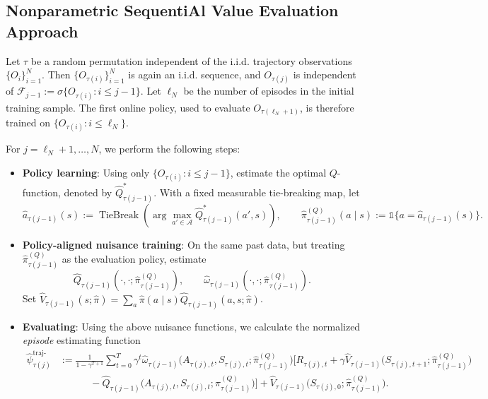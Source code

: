 \documentclass[12pt]{article}
\theoremstyle{remark}\newtheorem{remark}[theorem]{Remark}\theoremstyle{plain}
\newcommand{\EstestFunTraj}{\widehat{\psi}^{\text{traj-step}}}
\begin{document}
\subsection{Nonparametric SequentiAl Value Evaluation Approach}\label{sec:new_save}


Let $\tau$ be a random permutation independent of the i.i.d.
trajectory observations $\{O_i\}_{i=1}^N$.  Then
$\{O_{\tau(i)}\}_{i=1}^N$ is again an i.i.d. sequence, and
$O_{\tau(j)}$ is independent of
$\mathcal F_{j-1}:=\sigma\{O_{\tau(i)}:i\leq j-1\}$.
Let $\ell_N$ be the number of episodes in the initial training sample.
The first online policy, used to evaluate $O_{\tau(\ell_N+1)}$, is
therefore trained on
$\{O_{\tau(i)}:i\leq\ell_N\}$.

For $j = \ell_N + 1, \ldots, N$, we perform the following steps:
\begin{itemize}
    
    \item \textbf{Policy learning}: Using only
    $\{O_{\tau(i)}:i\leq j-1\}$, estimate the optimal $Q$-function,
    denoted by $\widehat Q_{\tau(j-1)}^*$.  With a fixed measurable
    tie-breaking map, let
    \[
        \widehat a_{\tau(j-1)}(s)
        :=\operatorname{TieBreak}\!\left(
        \arg\max_{a'\in\mathcal A}
        \widehat Q_{\tau(j-1)}^*(a',s)\right),
        \qquad
        \widehat{\pi}_{\tau(j - 1)}^{(Q)}(a \mid s)
        :=\mathds{1}\{a=\widehat a_{\tau(j-1)}(s)\}.
    \]

    \item \textbf{Policy-aligned nuisance training}: On the same past
    data, but treating
    $\widehat\pi_{\tau(j-1)}^{(Q)}$ as the evaluation policy, estimate
    \[
        \widehat Q_{\tau(j-1)}
        (\cdot,\cdot;\widehat\pi_{\tau(j-1)}^{(Q)}),
        \qquad
        \widehat\omega_{\tau(j-1)}
        (\cdot,\cdot;\widehat\pi_{\tau(j-1)}^{(Q)}).
    \]
    Set
    $\widehat V_{\tau(j-1)}(s;\widehat\pi)
      =\sum_a\widehat\pi(a\mid s)
       \widehat Q_{\tau(j-1)}(a,s;\widehat\pi)$.
    
    
    \item \textbf{Evaluating}: Using the above nuisance functions, we
    calculate the normalized \textit{episode} estimating function
    \[
        \begin{aligned}
            \EstestFunTraj_{\tau(j)}
            &:=\frac{1}{1-\gamma^{T+1}}\sum_{t = 0}^T \gamma^t \widehat{\omega}_{\tau(j - 1)}\big(A_{\tau(j), t}, S_{\tau(j), t}; \widehat{\pi}_{\tau(j - 1)}^{(Q)}\big) \big[ R_{\tau(j), t} + \gamma \widehat{V}_{\tau(j - 1)} \big(S_{\tau(j), t + 1}; \widehat{\pi}_{\tau(j - 1)}^{(Q)} \big)\\
            &~~~~~~~~~~~~~~  - \widehat{Q}_{\tau(j - 1)}  \big(A_{\tau(j), t}, S_{\tau(j), t}; \widehat{\pi}_{\tau(j - 1)}^{(Q)} \big)\big]  + \widehat{V}_{\tau(j - 1)} \big(S_{\tau(j), 0}; \widehat{\pi}_{\tau(j - 1)}^{(Q)} \big).
        \end{aligned}
    \]
\end{itemize}
\end{document}
